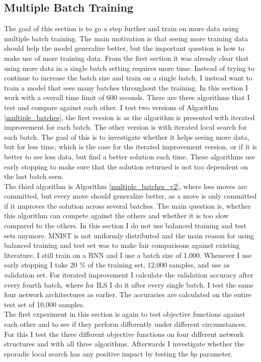 \subsection{Multiple Batch Training}
The goal of this section is to go a step further and train on more data using multiple batch training. The main motivation is that seeing more training data should help the model generalize better, but the important question is how to make use of more training data. From the first section it was already clear that using more data in a single batch setting requires more time. Instead of trying to continue to increase the batch size and train on a single batch, I instead want to train a model that sees many batches throughout the training. In this section I work with a overall time limit of 600 seconds. There are three algorithms that I test and compare against each other. I test two versions of Algorithm \ref{multiple_batches}, the first version is as the algorithm is presented with iterated improvement for each batch. The other version is with iterated local search for each batch. The goal of this is to investigate whether it helps seeing more data, but for less time, which is the case for the iterated improvement version, or if it is better to see less data, but find a better solution each time. These algorithms use early stopping to make sure that the solution returned is not too dependent on the last batch seen. \\

\noindent The third algorithm is Algorithm \ref{multiple_batches_v2}, where less moves are committed, but every move should generalize better, as a move is only committed if it improves the solution across several batches. The main question is, whether this algorithm can compete against the others and whether it is too slow compared to the others. In this section I do not use balanced training and test sets anymore. MNIST is not uniformly distributed and the main reason for using balanced training and test set was to make fair comparisons against existing literature. I still train on a BNN and I use a batch size of 1,000. Whenever I use early stopping I take 20 \% of the training set, 12,000 samples, and use as validation set. For iterated improvement I calculate the validation accuracy after every fourth batch, where for ILS I do it after every single batch. I test the same four network architectures as earlier. The accuracies are calculated on the entire test set of 10,000 samples. \\

\noindent The first experiment in this section is again to test objective functions against each other and to see if they perform differently under different circumstances. For this I test the three different objective functions on four different network structures and with all three algorithms. Afterwards I investigate whether the sporadic local search has any positive impact by testing the $bp$ parameter. 

